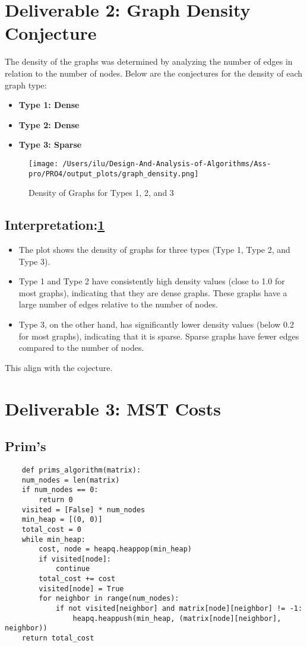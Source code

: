 \documentclass{article}
\begin{document}
\section*{Deliverable 2: Graph Density Conjecture}

The density of the graphs was determined by analyzing the number of edges in relation to the number of nodes. Below are the conjectures for the density of each graph type:

\begin{itemize}
    \item \textbf{Type 1: Dense}
    \item \textbf{Type 2: Dense}
    \item \textbf{Type 3: Sparse}
\end{itemize}
\begin{figure}
    \centering
    \texttt{[image: /Users/ilu/Design-And-Analysis-of-Algorithms/Ass-pro/PRO4/output\_plots/graph\_density.png]}
    \caption{Density of Graphs for Types 1, 2, and 3}\label{fig:density_plot}
\end{figure}
\subsection*{Interpretation:\ref*{fig:density_plot}}
\begin{itemize}
    \item The plot shows the density of graphs for three types (Type 1, Type 2, and Type 3).
    \item Type 1 and Type 2 have consistently high density values (close to 1.0 for most graphs), indicating that they are dense graphs. These graphs have a large number of edges relative to the number of nodes.
    \item Type 3, on the other hand, has significantly lower density values (below 0.2 for most graphs), indicating that it is sparse. Sparse graphs have fewer edges compared to the number of nodes.
\end{itemize}

This align with the cojecture.
\section*{Deliverable 3: MST Costs}

\subsection*{Prim's}
\begin{verbatim}
    def prims_algorithm(matrix):
    num_nodes = len(matrix)
    if num_nodes == 0:
        return 0
    visited = [False] * num_nodes
    min_heap = [(0, 0)]
    total_cost = 0
    while min_heap:
        cost, node = heapq.heappop(min_heap)
        if visited[node]:
            continue
        total_cost += cost
        visited[node] = True
        for neighbor in range(num_nodes):
            if not visited[neighbor] and matrix[node][neighbor] != -1:
                heapq.heappush(min_heap, (matrix[node][neighbor], neighbor))
    return total_cost
\end{verbatim}
\end{document}
